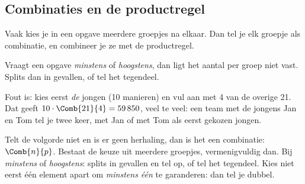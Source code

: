 \begin{oefeningen}
\end{oefeningen}

\subsection{Combinaties en de productregel}

Vaak kies je in een opgave meerdere groepjes na elkaar. Dan tel je elk groepje als combinatie, en combineer je ze met de productregel.


Vraagt een opgave \textit{minstens} of \textit{hoogstens}, dan ligt het aantal per groep niet vast. Splits dan in gevallen, of tel het tegendeel.


Fout is: kies eerst \textit{de} jongen (10 manieren) en vul aan met 4 van de overige 21. Dat geeft $10 \cdot \Comb{21}{4} = 59\,850$, veel te veel: een team met de jongens Jan en Tom tel je twee keer, met Jan of met Tom als eerst gekozen jongen.

\begin{werkwijze}
Telt de volgorde niet en is er geen herhaling, dan is het een combinatie: $\Comb{n}{p}$. Bestaat de keuze uit meerdere groepjes, vermenigvuldig dan. Bij \textit{minstens} of \textit{hoogstens}: splits in gevallen en tel op, of tel het tegendeel. Kies niet eerst één element apart om \textit{minstens één} te garanderen: dan tel je dubbel.
\end{werkwijze}

